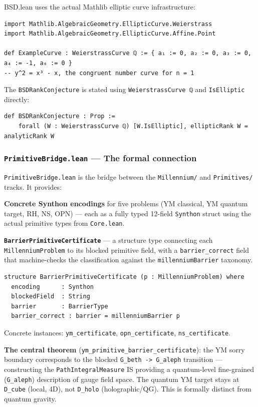 \documentclass[10pt,a4paper]{article}
\begin{document}
BSD.lean uses the actual Mathlib elliptic curve infrastructure:

\begin{lstlisting}[language=lean]
import Mathlib.AlgebraicGeometry.EllipticCurve.Weierstrass
import Mathlib.AlgebraicGeometry.EllipticCurve.Affine.Point

def ExampleCurve : WeierstrassCurve ℚ := { a₁ := 0, a₂ := 0, a₃ := 0, a₄ := -1, a₆ := 0 }
-- y^2 = x³ - x, the congruent number curve for n = 1
\end{lstlisting}

The \texttt{BSDRankConjecture} is stated using \texttt{WeierstrassCurve ℚ} and \texttt{IsElliptic} directly:

\begin{lstlisting}[language=lean]
def BSDRankConjecture : Prop :=
    forall (W : WeierstrassCurve ℚ) [W.IsElliptic], ellipticRank W = analyticRank W
\end{lstlisting}

\subsubsection{\texttt{PrimitiveBridge.lean} --- The formal connection}

\texttt{PrimitiveBridge.lean} is the bridge between the \texttt{Millennium/} and \texttt{Primitives/} tracks. It provides:

\textbf{Concrete Synthon encodings} for five problems (YM classical, YM quantum target, RH, NS, OPN) --- each as a fully typed 12-field \texttt{Synthon} struct using the actual primitive types from \texttt{Core.lean}.

\textbf{\texttt{BarrierPrimitiveCertificate}} --- a structure type connecting each \texttt{MillenniumProblem} to its blocked primitive field, with a \texttt{barrier\_correct} field that machine-checks the classification against the \texttt{millenniumBarrier} taxonomy.

\begin{lstlisting}[language=lean]
structure BarrierPrimitiveCertificate (p : MillenniumProblem) where
  encoding      : Synthon
  blockedField  : String
  barrier       : BarrierType
  barrier_correct : barrier = millenniumBarrier p
\end{lstlisting}

Concrete instances: \texttt{ym\_certificate}, \texttt{opn\_certificate}, \texttt{ns\_certificate}.

\textbf{The central theorem} (\texttt{ym\_primitive\_barrier\_certificate}): the YM sorry boundary corresponds to the blocked \texttt{G\_beth -\textgreater{} G\_aleph} transition --- constructing the \texttt{PathIntegralMeasure} IS providing a quantum-level fine-grained (\texttt{G\_aleph}) description of gauge field space. The quantum YM target stays at \texttt{D\_cube} (local, 4D), not \texttt{D\_holo} (holographic/QG). This is formally distinct from quantum gravity.
\end{document}
